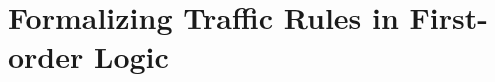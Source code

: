 \chapter[~~~~~~~~~~~~Formalizing Traffic Rules in FoL]{Formalizing Traffic Rules in First-order Logic}\label{ch:traffic-rules}












 

